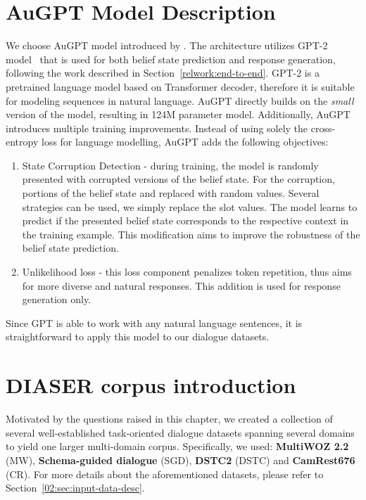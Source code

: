 \section{AuGPT Model Description}
We choose AuGPT model introduced by \citet{kulhanek-etal-2021-augpt}.
The architecture utilizes GPT-2 model~\cite{radford2019language} that is used for both belief state prediction and response generation, following the work described in Section~\ref{relwork:end-to-end}.
GPT-2 is a pretrained language model based on Transformer decoder, therefore it is suitable for modeling sequences in natural language.
AuGPT directly builds on the \emph{small} version of the model, resulting in 124M parameter model.
Additionally, AuGPT introduces multiple training improvements.
Instead of using solely the cross-entropy loss for language modelling, AuGPT adds the following objectives:
\begin{enumerate}
    \item State Corruption Detection - during training, the model is randomly presented with corrupted versions of the belief state.
    For the corruption, portions of the belief state and replaced with random values.
    Several strategies can be used, we simply replace the slot values.
    The model learns to predict if the presented belief state corresponds to the respective context in the training example.
    This modification aims to improve the robustness of the belief state prediction.
    \item Unlikelihood loss - this loss component penalizes token repetition, thus aims for more diverse and natural responses. This addition is used for response generation only.
\end{enumerate}
Since GPT is able to work with any natural language sentences, it is straightforward to apply this model to our dialogue datasets.

\section{DIASER corpus introduction}
\label{sec:diaser}
Motivated by the questions raised in this chapter, we created a collection of several well-established task-oriented dialogue datasets spanning several domains to yield one larger multi-domain corpus.
Specifically, we used: \textbf{MultiWOZ 2.2} (MW), \textbf{Schema-guided dialogue} (SGD), \textbf{DSTC2} (DSTC) and \textbf{CamRest676} (CR).
For more details about the aforementioned datasets, please refer to Section~\ref{02:sec:input-data-desc}.

